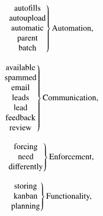 \begin{minipage}[b]{0.32\textwidth}
\begin{equation*}
  \left. \begin{tabular}{c}
    \text{autofills} \\
    \text{autoupload} \\
    \text{automatic} \\
    \text{parent} \\
    \text{batch} \\
  \end{tabular} \hspace{-0.2cm} \right \}
  \text{Automation,}
\end{equation*}
\end{minipage}
\begin{minipage}[b]{0.32\textwidth}
\begin{equation*}
  \left. \begin{tabular}{c}
    \text{available} \\
    \text{spammed} \\
    \text{email} \\
    \text{leads} \\
    \text{lead} \\
    \text{feedback} \\
    \text{review} \\
  \end{tabular} \hspace{-0.2cm} \right \}
  \text{Communication,}
\end{equation*}
\end{minipage}
\begin{minipage}[b]{0.32\textwidth}
\begin{equation*}
  \left. \begin{tabular}{c}
    \text{forcing} \\
    \text{need} \\
    \text{differently} \\
  \end{tabular} \hspace{-0.2cm} \right \}
  \text{Enforcement,}
\end{equation*}
\end{minipage}
\begin{minipage}[b]{0.32\textwidth}
\begin{equation*}
  \left. \begin{tabular}{c}
    \text{storing} \\
    \text{kanban} \\
    \text{planning} \\
  \end{tabular} \hspace{-0.2cm} \right \}
  \text{Functionality,}
\end{equation*}
\end{minipage}
